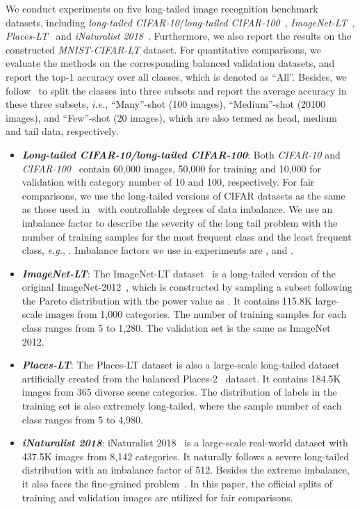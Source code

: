\documentclass[10pt,journal,compsoc]{IEEEtran}
\newcommand{\eg}{\emph{e.g.}}
\newcommand{\ie}{\emph{i.e.}}
\begin{document}
We conduct experiments on five long-tailed image recognition benchmark datasets, including \emph{long-tailed CIFAR-10}/\emph{long-tailed CIFAR-100}~\cite{cifar}, \emph{ImageNet-LT}~\cite{oltr}, \emph{Places-LT}~\cite{zhou2017places} and \emph{iNaturalist 2018}~\cite{van2018inaturalist}. Furthermore, we also report the results on the constructed \emph{MNIST-CIFAR-LT} dataset. For quantitative comparisons, we evaluate the methods on the corresponding balanced validation datasets, and report the top-1 accuracy over all classes, which is denoted as ``\textsf{All}''. Besides, we follow~\cite{decouple,oltr} to split the classes into three subsets and report the average accuracy in these three subsets, \ie, ``\textsf{Many}''-shot (100 images), ``\textsf{Medium}''-shot (20100 images), and ``\textsf{Few}''-shot (20 images), which are also termed as head, medium and tail data, respectively.

\begin{itemize}
\item{\textbf{\emph{Long-tailed CIFAR-10/long-tailed CIFAR-100}}}: Both \emph{CIFAR-10} and \emph{CIFAR-100}~\cite{cifar} contain 60,000 images, 50,000 for training and 10,000 for validation with category number of 10 and 100, respectively. For fair comparisons, we use the long-tailed versions of CIFAR datasets as the same as those used in~\cite{ldam} with controllable degrees of data imbalance. We use an imbalance factor  to describe the severity of the long tail problem with the number of training samples for the most frequent class and the least frequent class, \eg, . Imbalance factors we use in experiments are ,  and .



\item{\textbf{\emph{ImageNet-LT}}}: The ImageNet-LT dataset~\cite{oltr} is a long-tailed version of the original ImageNet-2012~\cite{ILSVRC15}, which is constructed by sampling a subset following the Pareto distribution with the power value as . It contains 115.8K large-scale images from 1,000 categories. The number of training samples for each class ranges from 5 to 1,280. The validation set is the same as ImageNet 2012.



\item{\textbf{\emph{Places-LT}}}: The Places-LT dataset is also a large-scale long-tailed dataset artificially created from the balanced Places-2~\cite{zhou2017places} dataset. It contains 184.5K images from 365 diverse scene categories. The distribution of labels in the training set is also extremely long-tailed, where the sample number of each class ranges from 5 to 4,980.

\item{\textbf{\emph{iNaturalist 2018}}}: iNaturalist 2018~\cite{van2018inaturalist} is a large-scale real-world dataset with 437.5K images from 8,142 categories. It naturally follows a severe long-tailed distribution with an imbalance factor of 512. Besides the extreme imbalance, it also faces the fine-grained problem~\cite{wei2019deep,pcm,scda}. In this paper, the official splits of training and validation images are utilized for fair comparisons.\end{itemize}
\end{document}
